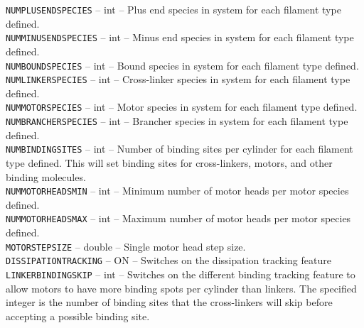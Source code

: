 \documentclass[11pt, oneside]{article}   	%
\begin{document}
     \noindent\texttt{NUMPLUSENDSPECIES} -- int -- Plus end species in system for each filament type defined. \\
   
     \noindent\texttt{NUMMINUSENDSPECIES} -- int -- Minus end species in system for each filament type defined. \\
   
     \noindent\texttt{NUMBOUNDSPECIES} -- int -- Bound species in system for each filament type defined. \\
   
      \noindent\texttt{NUMLINKERSPECIES} -- int -- Cross-linker species in system for each filament type defined.  \\
   
       \noindent\texttt{NUMMOTORSPECIES} -- int -- Motor species in system for each filament type defined. \\
   
       \noindent\texttt{NUMBRANCHERSPECIES} -- int -- Brancher species in system for each filament type defined. \\
   
       \noindent\texttt{NUMBINDINGSITES} -- int -- Number of binding sites per cylinder for each filament type defined. 
       This will set binding sites for cross-linkers, motors, and other binding molecules. \\
   
       \noindent\texttt{NUMMOTORHEADSMIN} -- int -- Minimum number of motor heads per motor species defined. \\
     
       \noindent\texttt{NUMMOTORHEADSMAX} -- int -- Maximum number of motor heads per motor species defined. \\
     
       \noindent\texttt{MOTORSTEPSIZE} -- double -- Single motor head step size. \\
       
       \noindent \texttt{DISSIPATIONTRACKING} -- ON -- Switches on the dissipation tracking feature \\
       
       \noindent \texttt{LINKERBINDINGSKIP} -- int -- Switches on the different binding tracking feature to allow motors to have more binding spots per cylinder than linkers.  The specified integer is the number of binding sites that the cross-linkers will skip before accepting a possible binding site. \\
       
\end{document}
